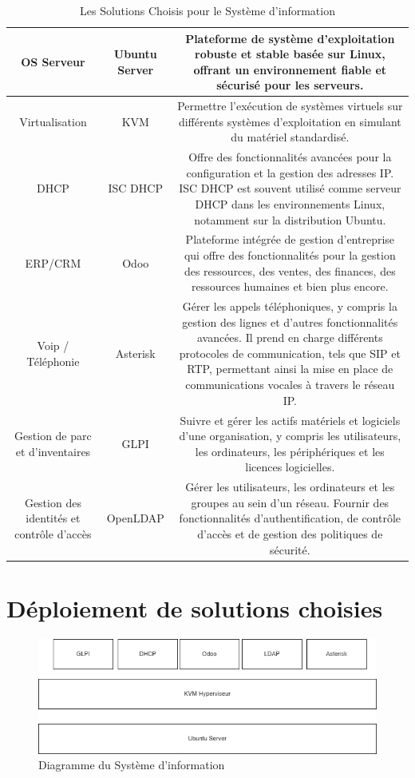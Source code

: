 \begin{table}[H]
\begin{center}
\begin{tabular}{|c{3cm}|c{3cm}|c{8cm}|}
\hline
OS Serveur & Ubuntu Server & Plateforme de système d'exploitation robuste et stable basée sur Linux, offrant un environnement fiable et sécurisé pour les serveurs. \\
\hline
Virtualisation & KVM & Permettre l'exécution de systèmes virtuels sur différents systèmes d'exploitation en simulant du matériel standardisé. \\
\hline
DHCP & ISC DHCP & Offre des fonctionnalités avancées pour la configuration et la gestion des adresses IP. ISC DHCP est souvent utilisé comme serveur DHCP dans les environnements Linux, notamment sur la distribution Ubuntu. \\
\hline
ERP/CRM & Odoo & Plateforme intégrée de gestion d'entreprise qui offre des fonctionnalités pour la gestion des ressources, des ventes, des finances, des ressources humaines et bien plus encore. \\
\hline
Voip / Téléphonie & Asterisk & Gérer les appels téléphoniques, y compris la gestion des lignes et d'autres fonctionnalités avancées. Il prend en charge différents protocoles de communication, tels que SIP et RTP, permettant ainsi la mise en place de communications vocales à travers le réseau IP. \\
\hline
Gestion de parc et d'inventaires & GLPI & Suivre et gérer les actifs matériels et logiciels d'une organisation, y compris les utilisateurs, les ordinateurs, les périphériques et les licences logicielles. \\
\hline
Gestion des identités et contrôle d'accès & OpenLDAP & Gérer les utilisateurs, les ordinateurs et les groupes au sein d'un réseau. Fournir des fonctionnalités d'authentification, de contrôle d'accès et de gestion des politiques de sécurité. \\
\hline
\end{tabular}
\caption{Les Solutions Choisis pour le Système d'information}
\label{1}
\end{center}
\end{table}


\section{Déploiement de solutions choisies}

\begin{figure}[H]
 \centering
    \includegraphics[width=15cm]{Images/diagsi.png}
    \caption{Diagramme du Système d'information}
    \label{fig:diagramme-SI}
\end{figure}



